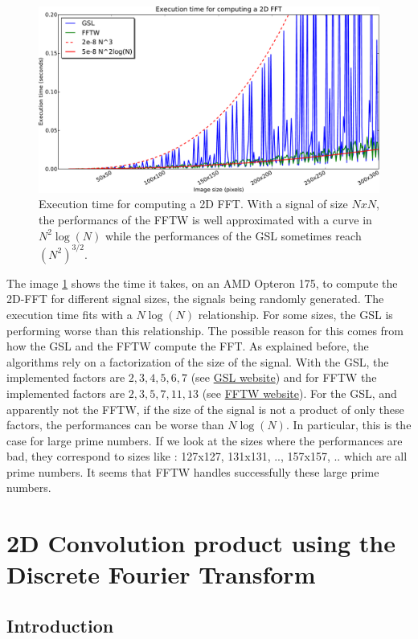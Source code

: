 \documentclass[a4paper,10pt,twoside]{article}
\begin{document}
\begin{figure}[htbp]
\center \includegraphics[width=0.6\linewidth]{../Images/test_fft-crop.pdf}
\caption{\label{fig:test_fft.pdf} Execution time for computing a 2D FFT. With a signal of size $NxN$, the performancs of the FFTW is well approximated with a curve in $N^2 \log(N)$ while the performances of the GSL sometimes reach $(N^2)^{3/2}$.}
\end{figure}

The image \ref{fig:test_fft.pdf} shows the time it takes, on an AMD Opteron 175, to compute the 2D-FFT for different signal sizes, the signals being randomly generated. The execution time fits with a $N \log(N)$ relationship. For some sizes, the GSL is performing worse than this relationship. The possible reason for this comes from how the GSL and the FFTW compute the FFT. As explained before, the algorithms rely on a factorization of the size of the signal. With the GSL, the implemented factors are $2,3,4,5,6,7$ (see \href{http://www.gnu.org/software/gsl/manual/html_node/Mixed_002dradix-FFT-routines-for-complex-data.html}{GSL website}) and for FFTW the implemented factors are $2,3,5,7,11,13$ (see \href{http://www.fftw.org/fftw3_doc/Complex-DFTs.html#Complex-DFTs}{FFTW website}). For the GSL, and apparently not the FFTW, if the size of the signal is not a product of only these factors, the performances can be worse than $N \log(N)$. In particular, this is the case for large prime numbers. If we look at the sizes where the performances are bad, they correspond to sizes like : 127x127, 131x131, .., 157x157, .. which are all prime numbers. It seems that FFTW handles successfully these large prime numbers.\\

\pagebreak

\section{2D Convolution product using the Discrete Fourier Transform}
\subsection{Introduction}
\end{document}
